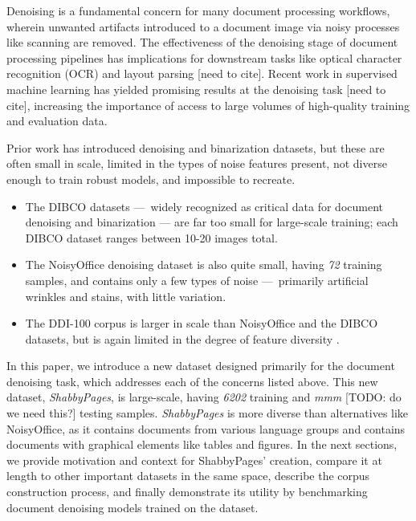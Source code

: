 \documentclass[runningheads]{llncs}
\begin{document}
Denoising is a fundamental concern for many document processing workflows, wherein unwanted artifacts introduced to a document image via noisy processes like scanning are removed.
The effectiveness of the denoising stage of document processing pipelines has implications for downstream tasks like optical character recognition (OCR) and layout parsing [need to cite].
Recent work in supervised machine learning has yielded promising results at the denoising task [need to cite], increasing the importance of access to large volumes of high-quality training and evaluation data.

Prior work has introduced denoising and binarization datasets, but these are often small in scale, limited in the types of noise features present, not diverse enough to train robust models, and impossible to recreate.
\begin{itemize}
\item The DIBCO datasets — widely recognized as critical data for document denoising and binarization — are far too small for large-scale training; each DIBCO dataset ranges between 10-20 images total.
\item The NoisyOffice denoising dataset \cite{ref_NoisyOfficeDatabase} is also quite small, having \emph{72} training samples, and contains only a few types of noise — primarily artificial wrinkles and stains, with little variation.
\item The DDI-100 corpus \cite{ddi-100-2019} is larger in scale than NoisyOffice and the DIBCO datasets, but is again limited in the degree of feature diversity \cite{detection-masking-2022}.
\end{itemize}

In this paper, we introduce a new dataset designed primarily for the document denoising task, which addresses each of the concerns listed above.
This new dataset, \emph{ShabbyPages}, is large-scale, having \emph{6202} training and \emph{mmm} [TODO: do we need this?] testing samples.
\emph{ShabbyPages} is more diverse than alternatives like NoisyOffice, as it contains documents from various language groups and contains documents with graphical elements like tables and figures.
In the next sections, we provide motivation and context for ShabbyPages' creation, compare it at length to other important datasets in the same space, describe the corpus construction process, and finally demonstrate its utility by benchmarking document denoising models trained on the dataset.
\end{document}
